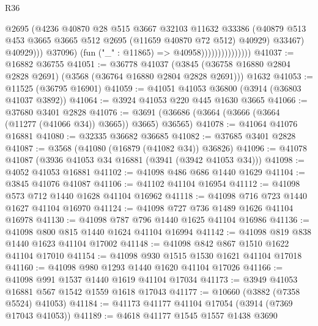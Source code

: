 \begin{lexlean}{R36}
\begin{coremodule}
                                        @2695
                                        (@4236
                                          @40870
                                          @28
                                          @515
                                          @3667
                                          @32103
                                          @11632
                                          @33386
                                          (@40879
                                            @513
                                            @453
                                            @3665
                                            @3665
                                            @512
                                            @2695
                                            (@11659 @40870 @72 @512)
                                            @40929)
                                          @33467)
                                        @40929)))
                                  @37096)
                                (fun ("_" : @11865) => @40958)))))))))))))))
@41037 := @16882 @36755
@41051 := @36778
    @41037
    (@3845 (@36758 @16880 @2804 @2828 @2691) (@3568 (@36764 @16880 @2804 @2828 @2691)))
    @1632
@41053 := @11525 (@36795 @16901)
@41059 := @41051 @41053 @36800 (@3914 (@36803 @41037 @3892))
@41064 := @3924 @41053 @220 @445 @1630 @3665
@41066 := @37680 @3401 @2828
@41076 := @3691 (@36686 (@3664 (@3666 (@3664 (@11277 (@41066 @34)) @3665)) @3665) @36565)
@41078 := @41064 @41076 @16881
@41080 := @32335 @36682 @36685
@41082 := @37685 @3401 @2828
@41087 := @3568 (@41080 (@16879 (@41082 @34)) @36826)
@41096 := @41078 @41087 (@3936 @41053 @34 @16881 (@3941 (@3942 @41053 @34)))
@41098 := @4052 @41053 @16881
@41102 := @41098 @486 @686 @1440 @1629
@41104 := @3845 @41076 @41087
@41106 := @41102 @41104 @16954
@41112 := @41098 @573 @712 @1440 @1628 @41104 @16962
@41118 := @41098 @716 @723 @1440 @1627 @41104 @16970
@41124 := @41098 @727 @736 @1489 @1626 @41104 @16978
@41130 := @41098 @787 @796 @1440 @1625 @41104 @16986
@41136 := @41098 @800 @815 @1440 @1624 @41104 @16994
@41142 := @41098 @819 @838 @1440 @1623 @41104 @17002
@41148 := @41098 @842 @867 @1510 @1622 @41104 @17010
@41154 := @41098 @930 @1515 @1530 @1621 @41104 @17018
@41160 := @41098 @980 @1293 @1440 @1620 @41104 @17026
@41166 := @41098 @991 @1537 @1440 @1619 @41104 @17034
@41173 := @3949 @41053 @16881 @567 @1542 @1559 @1618 @17043
@41177 := @10660 (@3882 (@7358 @5524) @41053)
@41184 := @41173 @41177 @41104 @17054 (@3914 (@7369 @17043 @41053))
@41189 := @4618 @41177 @1545 @1557 @1438 @3690

\end{coremodule}
\end{lexlean}
